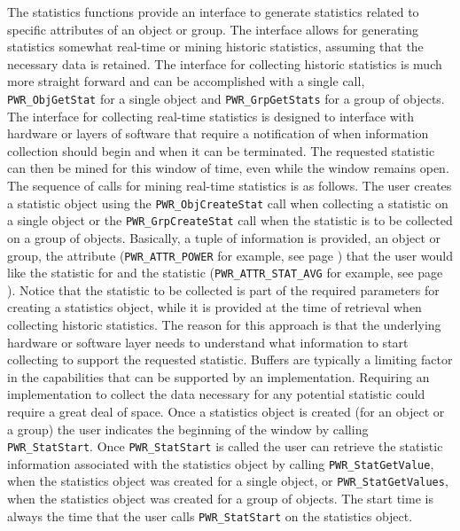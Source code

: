 \documentclass[12pt]{report} %
\begin{document}
The statistics functions provide an interface to generate statistics related to specific attributes of an object or group. 
The interface allows for generating statistics somewhat real-time or mining historic statistics, assuming that the necessary data is retained.
The interface for collecting historic statistics is much more straight forward and can be accomplished with a single call, \texttt{PWR_ObjGetStat} for a single object and \texttt{PWR_GrpGetStats} for a group of objects. 
The interface for collecting real-time statistics is designed to interface with hardware or layers of software that require a notification of when information collection should begin and when it can be terminated. 
The requested statistic can then be mined for this window of time, even while the window remains open. 
The sequence of calls for mining real-time statistics is as follows.
The user creates a statistic object using the \texttt{PWR_ObjCreateStat} call when collecting a statistic on a single object or the \texttt{PWR_GrpCreateStat} call when the statistic is to be collected on a group of objects.
Basically, a tuple of information is provided, an object or group, the attribute (\texttt{PWR_ATTR_POWER} for example, see page \pageref{type:AttrName}) that the user would like the statistic for and the statistic (\texttt{PWR_ATTR_STAT_AVG} for example, see page \pageref{type:AttrStat}).
Notice that the statistic to be collected is part of the required parameters for creating a statistics object, while it is provided at the time of retrieval when collecting historic statistics.
The reason for this approach is that the underlying hardware or software layer needs to understand what information to start collecting to support the requested statistic. 
Buffers are typically a limiting factor in the capabilities that can be supported by an implementation. 
Requiring an implementation to collect the data necessary for any potential statistic could require a great deal of space.
Once a statistics object is created (for an object or a group) the user indicates the beginning of the window by calling \texttt{PWR_StatStart}.
Once \texttt{PWR_StatStart} is called the user can retrieve the statistic information associated with the statistics object by calling \texttt{PWR_StatGetValue}, when the statistics object was created for a single object, or \texttt{PWR_StatGetValues}, when the statistics object was created for a group of objects.
The start time is always the time that the user calls \texttt{PWR_StatStart} on the statistics object.
\end{document}
